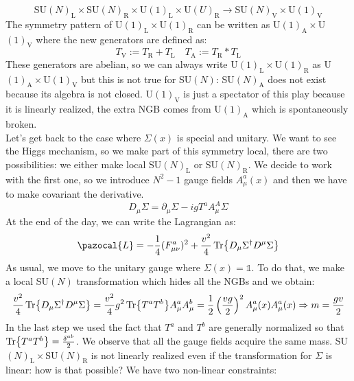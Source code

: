 \documentclass[../main.tex]{subfiles}
\begin{document}
\[
\text{SU}(N)_{\text{L}}\times\text{SU}(N)_{\text{R}}\times\text{U}(1)_{\text{L}}\times\text{U}(U)_{\text{R}}\to\text{SU}(N)_{\text{V}}\times\text{U}(1)_{\text{V}}
\]
The symmetry pattern of U$(1)_{\text{L}}\times$U$(1)_{\text{R}}$ can be written as U$(1)_{\text{A}}\times$U$(1)_{\text{V}}$ where the new generators are defined as:
\[
T_{\text{V}}:=T_{\text{R}}+T_{\text{L}} \quad T_{\text{A}}:=T_{\text{R}}*T_{\text{L}}
\]
These generators are abelian, so we can always write U$(1)_{\text{L}}\times$U$(1)_{\text{R}}$ as U$(1)_{\text{A}}\times$U$(1)_{\text{V}}$ but this is not true for SU$(N)$: SU$(N)_{\text{A}}$ does not exist because its algebra is not closed. U$(1)_{\text{V}}$ is just a spectator of this play because it is linearly realized, the extra NGB comes from U$(1)_{\text{A}}$ which is spontaneously broken.\\
Let's get back to the case where $\Sigma(x)$ is special and unitary. We want to see the Higgs mechanism, so we make part of this symmetry local, there are two possibilities: we either make local SU$(N)_{\text{L}}$ or SU$(N)_{\text{R}}$. We decide to work with the first one, so we introduce $N^2-1$ gauge fields $A_\mu^a(x)$ and then we have to make covariant the derivative.
\[
D_\mu\Sigma=\partial_\mu\Sigma-igT^aA_\mu^A\Sigma
\]
At the end of the day, we can write the Lagrangian as:
\[
\pazocal{L}=-\frac{1}{4}(F_{\mu\nu}^a)^2+\frac{v^2}{4}\Tr{D_\mu\Sigma^\dagger D^\mu\Sigma}
\]
As usual, we move to the unitary gauge where $\Sigma(x)=\mathbb{1}$. To do that, we make a local SU$(N)$ transformation which hides all the NGBs and we obtain:
\[
\frac{v^2}{4}\Tr{D_\mu\Sigma^\dagger D^\mu\Sigma}=\frac{v^2}{4}g^2\Tr{T^aT^b}A_\mu^aA_\mu^b=\frac{1}{2}\left(\frac{vg}{2}\right)^2A_\mu^a(x)A_\mu^a(x)\Rightarrow m=\frac{gv}{2}
\]
In the last step we used the fact that $T^a$ and $T^b$ are generally normalized so that $\Tr{T^aT^b}=\frac{\delta^{ab}}{2}$. We observe that all the gauge fields acquire the same mass.
SU$(N)_{\text{L}}\times$SU$(N)_{\text{R}}$ is not linearly realized even if the transformation for $\Sigma$ is linear: how is that possible? We have two non-linear constraints:
\end{document}
